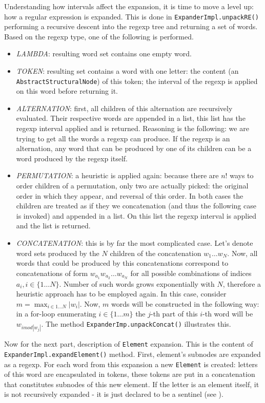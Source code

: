 \documentclass[a4paper,10pt,oneside]{article}
\newcommand{\code}[1]{\texttt{#1}}
\begin{document}
Understanding how intervals affect the expansion, it is time to move a level up: how a regular expression is expanded. This is done in \code{ExpanderImpl.unpackRE()} performing a recursive descent into the regexp tree and returning a set of words. Based on the regexp type, one of the following is performed.
\begin{itemize}
	\item \emph{LAMBDA}: resulting word set contains one empty word.
	\item \emph{TOKEN}: resulting set contains a word with one letter: the content (an \code{AbstractStructuralNode}) of this token; the interval of the regexp is applied on this word before returning it.
	\item \emph{ALTERNATION}: first, all children of this alternation are recursively evaluated. Their respective words are appended in a list, this list has the regexp interval applied and is returned. Reasoning is the following: we are trying to get all the words a regexp can produce. If the regexp is an alternation, any word that can be produced by one of its children can be a word produced by the regexp itself.
	\item \emph{PERMUTATION}: a heuristic is applied again: because there are $n!$ ways to order children of a permutation, only two are actually picked: the original order in which they appear, and reversal of this order. In both cases the children are treated as if they we concatenation (and thus the following case is invoked) and appended in a list. On this list the regexp interval is applied and the list is returned.
	\item \emph{CONCATENATION}: this is by far the most complicated case. Let's denote word sets produced by the $N$ children of the concatenation $ w_1 \ldots w_N $. Now, all words that could be produced by this concatenations correspond to concatenations of form $w_{a_1} w_{a_2} \ldots w_{a_N}$ for all possible combinations of indices $a_i, i  \in \{1 \ldots N\}$. Number of such words grows exponentially with $N$, therefore a heuristic approach has to be employed again.\newline
In this case, consider $ m = \max_{i \in 1 \ldots N}{|w_i|} $. Now, $ m $ words will be constructed in the following way: in a for-loop enumerating $ i \in \{1 \ldots m\}$ the $j$-th part of this $i$-th word will be $w_{i mod |w_j|}$. The method \code{ExpanderImp.unpackConcat()} illustrates this.
\end{itemize}

Now for the next part, description of \code{Element} expansion. This is the content of \code{ExpanderImpl.expandElement()} method. First, element's subnodes are expanded as a regexp. For each word from this expansion a new \code{Element} is created: letters of this word are encapsulated in tokens, these tokens are put in a concatenation that constitutes subnodes of this new element. If the letter is an element itself, it is not recursively expanded - it is just declared to be a sentinel (see \cite[section 3.3]{archdoc}).\\
\end{document}
